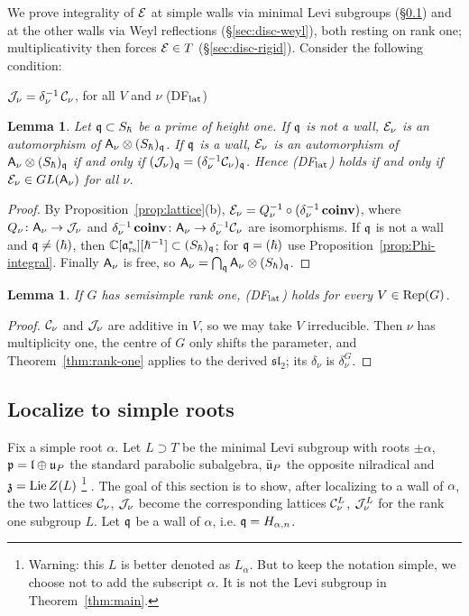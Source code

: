 \documentclass{article}
\theoremstyle{plain}
\newtheorem{lemma}[theorem]{Lemma}
\theoremstyle{definition}
\theoremstyle{remark}
\numberwithin{equation}{section}
\begin{document}
We prove integrality of $\mathcal E$ at simple walls via minimal Levi subgroups (\S\ref{sec:disc-simple}) and at the other walls via Weyl reflections (\S\ref{sec:disc-weyl}), both resting on rank one; multiplicativity then forces $\mathcal E\in T$ (\S\ref{sec:disc-rigid}). Consider the following condition:
\begin{center}
    $\mathcal J_\nu=\delta_\nu^{-1}\,\mathcal C_\nu$, for all $V$ and $\nu$ \quad (DF$_{\rm lat}$)
\end{center}

\begin{lemma}\label{lem:int}
Let $\mathfrak q\subset S_\hbar$ be a prime of height one. If $\mathfrak q$ is not a wall, $\mathcal E_\nu$ is an automorphism of $\mathsf A_\nu\otimes(S_\hbar)_\mathfrak q$. If $\mathfrak q$ is a wall, $\mathcal E_\nu$ is an automorphism of $\mathsf A_\nu\otimes(S_\hbar)_\mathfrak q$ if and only if $(\mathcal J_\nu)_\mathfrak q=(\delta_\nu^{-1}\mathcal C_\nu)_\mathfrak q$. Hence (DF$_{\rm lat}$) holds if and only if $\mathcal E_\nu\in GL(\mathsf A_\nu)$ for all $\nu$.
\end{lemma}

\begin{proof}
By Proposition~\ref{prop:lattice}(b), $\mathcal E_\nu=Q_\nu^{-1}\circ(\delta_\nu^{-1}\operatorname{\mathbf{coinv}})$, where $Q_\nu\colon\mathsf A_\nu\to\mathcal J_\nu$ and $\delta_\nu^{-1}\operatorname{\mathbf{coinv}}\colon\mathsf A_\nu\to\delta_\nu^{-1}\mathcal C_\nu$ are isomorphisms. If $\mathfrak q$ is not a wall and $\mathfrak q\neq(\hbar)$, then $\mathbb{C}[\mathfrak{a}^*_{\mathrm{rs}}][\hbar^{-1}]\subset(S_\hbar)_\mathfrak q$; for $\mathfrak q=(\hbar)$ use Proposition~\ref{prop:Phi-integral}. Finally $\mathsf A_\nu$ is free, so $\mathsf A_\nu=\bigcap_\mathfrak q\mathsf A_\nu\otimes(S_\hbar)_\mathfrak q$.
\end{proof}

\begin{lemma}\label{lem:rank-one-all}
If $G$ has semisimple rank one, (DF$_{\rm lat}$) holds for every $V\in\operatorname{Rep}(G)$.
\end{lemma}

\begin{proof}
$\mathcal C_\nu$ and $\mathcal J_\nu$ are additive in $V$, so we may take $V$ irreducible. Then $\nu$ has multiplicity one, the centre of $G$ only shifts the parameter, and Theorem~\ref{thm:rank-one} applies to the derived $\mathfrak{sl}_2$; its $\delta_\nu$ is $\delta^G_\nu$.
\end{proof}

\subsection{Localize to simple roots}\label{sec:disc-simple}
Fix a simple root $\alpha$. Let $L\supset T$ be the minimal Levi subgroup with roots $\pm\alpha$, $\mathfrak{p}=\mathfrak{l}\oplus\mathfrak{u}_P$ the standard parabolic subalgebra, $\bar{\mathfrak{u}}_P$ the opposite nilradical and $\mathfrak{z}=\operatorname{Lie} Z(L)$ \footnote{Warning: this $L$ is better denoted as $L_\alpha$. But to keep the notation simple, we choose not to add the subscript $\alpha$. It is not the Levi subgroup in Theorem~\ref{thm:main}.} . The goal of this section is to show, after localizing to a wall of $\alpha$, the two lattices $\mathcal C_\nu$, $\mathcal J_\nu$ become the corresponding lattices $\mathcal C_\nu^L$, $\mathcal J_\nu^L$ for the rank one subgroup $L$. Let $\mathfrak q$ be a wall of $\alpha$, i.e. $\mathfrak q = H_{\alpha,n}$. 
\end{document}
